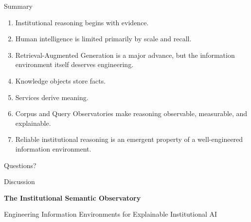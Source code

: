 \documentclass[aspectratio=169]{beamer}
\begin{document}
\begin{frame}{Summary}

\begin{enumerate}

\item Institutional reasoning begins with evidence.

\vspace{0.15cm}

\item Human intelligence is limited primarily by scale and recall.

\vspace{0.15cm}

\item Retrieval-Augmented Generation is a major advance,
but the information environment itself deserves engineering.

\vspace{0.15cm}

\item Knowledge objects store facts.

\vspace{0.15cm}

\item Services derive meaning.

\vspace{0.15cm}

\item Corpus and Query Observatories make reasoning
observable, measurable, and explainable.

\vspace{0.15cm}

\item Reliable institutional reasoning is an emergent property
of a well-engineered information environment.

\end{enumerate}

\end{frame}


\begin{frame}

\centering

\vspace{1.3cm}

{\Huge Questions?}

\vspace{1.0cm}

{\Large Discussion}

\vspace{1.5cm}

\Large

\textbf{The Institutional Semantic Observatory}

\vspace{0.25cm}

Engineering Information Environments for Explainable Institutional AI

\end{frame}

\end{document}
